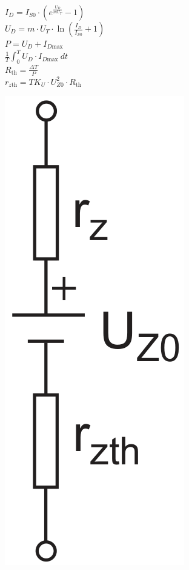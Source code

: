 \documentclass[a5paper, 12pt, twoside]{scrartcl}
\begin{document}
\begin{minipage}{.69\linewidth}
  \dotfill\(I_D = I_{S0} \cdot \left( e^{\frac{U_D}{mU_T}}-1 \right)\)\\[1em]
  \dotfill\(U_D = m \cdot U_T \cdot \ln\left(\frac{I_D}{I_{S0}} + 1\right)\)\\[1em]
  \dotfill\(P = U_D + I_{D\text{max}}\)\\[1em]
  \dotfill\(\frac{1}{T} \int_0^T U_D \cdot I_{D\text{max}}\ dt\)\\[1em]
  \dotfill\(R_{\text{th}} = \frac{\Delta T}{P}\)\\[1em]
  \dotfill\(r_{z\text{th}} = TK_U \cdot U^2_{Z0} \cdot R_{\text{th}}\)
\end{minipage}\hfill%
\begin{minipage}{.29\linewidth}
  {\centering
    \includegraphics[width=.4\textwidth]{ESB_ZDiode}
    \par
  }
\end{minipage}

\vspace{1cm}
\end{document}
